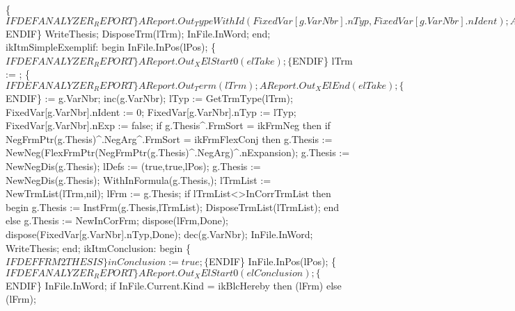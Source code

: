                \{$IFDEF ANALYZER_REPORT\}
               AReport.Out_TypeWithId(FixedVar[g.VarNbr].nTyp,
                                      FixedVar[g.VarNbr].nIdent);
               AReport.Out_Term(lTrm);
               AReport.Out_XElEnd(elTakeAsVar);
               \{$ENDIF\}
               WriteThesis;
               DisposeTrm(lTrm); InFile.InWord;
            end;
         ikItmSimpleExemplif:
            begin
               InFile.InPos(lPos);
               \{$IFDEF ANALYZER_REPORT\}
               AReport.Out_XElStart0(elTake);
               \{$ENDIF\}
               lTrm := ;
               \{$IFDEF ANALYZER_REPORT\}
               AReport.Out_Term(lTrm);
               AReport.Out_XElEnd(elTake);
               \{$ENDIF\}
                := g.VarNbr; inc(g.VarNbr);
               lTyp := GetTrmType(lTrm);
               FixedVar[g.VarNbr].nIdent := 0;
               FixedVar[g.VarNbr].nTyp := lTyp;
               FixedVar[g.VarNbr].nExp := false;
               if g.Thesis^.FrmSort = ikFrmNeg then
                  if NegFrmPtr(g.Thesis)^.NegArg^.FrmSort = ikFrmFlexConj then
                     g.Thesis := NewNeg(FlexFrmPtr(NegFrmPtr(g.Thesis)^.NegArg)^.nExpansion);
               g.Thesis := NewNegDis(g.Thesis);
               lDefs := (true,true,lPos);
               g.Thesis := NewNegDis(g.Thesis);
               WithInFormula(g.Thesis,);
               lTrmList := NewTrmList(lTrm,nil);
               lFrm := g.Thesis;
               if lTrmList<>InCorrTrmList then
               begin
                  g.Thesis := InstFrm(g.Thesis,lTrmList);
                  DisposeTrmList(lTrmList);
               end
               else g.Thesis := NewInCorFrm;
               dispose(lFrm,Done);
               dispose(FixedVar[g.VarNbr].nTyp,Done);
               dec(g.VarNbr);
               InFile.InWord;
               WriteThesis;
            end;
         ikItmConclusion:
            begin
               \{$IFDEF FRM2THESIS\}
                   inConclusion := true;
               \{$ENDIF\}
                   InFile.InPos(lPos);
               \{$IFDEF ANALYZER_REPORT\}
               AReport.Out_XElStart0(elConclusion);
               \{$ENDIF\}
               InFile.InWord;
               if InFile.Current.Kind = ikBlcHereby then
                  (lFrm)
               else (lFrm);
